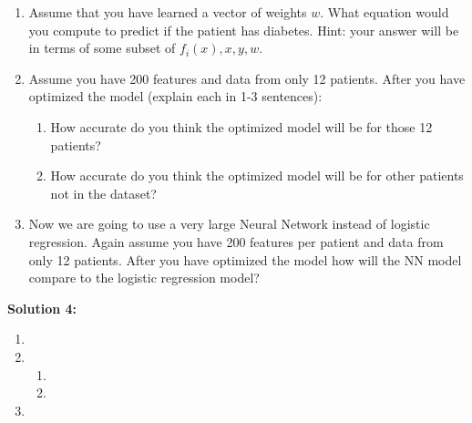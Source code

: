 \documentclass[]{article}
\begin{document}
\begin{enumerate}[label=(\alph*)]
    \item Assume that you have learned a vector of weights $w$. What equation would you compute to predict if the patient has diabetes. Hint: your answer will be in terms of some subset of $f_i(x), x, y, w$.
    \item Assume you have 200 features and data from only 12 patients. After you have optimized the model (explain each in 1-3 sentences):
    \begin{enumerate}[label=(\roman*)]
        \item How accurate do you think the optimized model will be for those 12 patients?
        \item How accurate do you think the optimized model will be for other patients not in  the dataset?
    \end{enumerate}
    \item Now we are going to use a very large Neural Network instead of logistic regression. Again assume you have 200 features per patient and data from only 12 patients. After you have optimized the model how will the NN model compare to the logistic regression model?
\end{enumerate}

\textbf{Solution 4:}
\begin{enumerate}[label=(\alph*)]
    \item %
    \item \begin{enumerate}[label=(\roman*)]
        \item %
        \item %
    \end{enumerate}
    \item %
\end{enumerate}
\end{document}
